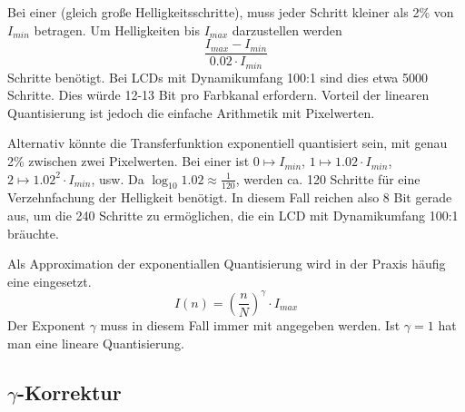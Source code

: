 Bei einer  (gleich große Helligkeitsschritte), muss jeder Schritt kleiner als 2\% von $I_{min}$ betragen.
Um Helligkeiten bis $I_{max}$ darzustellen werden
\[
	\frac{I_{max} - I_{min}}{0.02 \cdot I_{min}}
\]
Schritte benötigt.
Bei LCDs mit Dynamikumfang 100:1 sind dies etwa 5000 Schritte.
Dies würde 12-13 Bit pro Farbkanal erfordern.
Vorteil der linearen Quantisierung ist jedoch die einfache Arithmetik mit Pixelwerten.

Alternativ könnte die Transferfunktion exponentiell quantisiert sein, mit genau 2\% zwischen zwei Pixelwerten.
Bei einer  ist $0 \mapsto I_{min}$, $1 \mapsto 1.02 \cdot I_{min}$, $2 \mapsto 1.02^2 \cdot I_{min}$, usw.
Da $\log_{10} 1.02 \approx \frac{1}{120}$, werden ca. 120 Schritte für eine Verzehnfachung der Helligkeit benötigt.
In diesem Fall reichen also 8 Bit gerade aus, um die 240 Schritte zu ermöglichen, die ein LCD mit Dynamikumfang 100:1 bräuchte.

Als Approximation der exponentiallen Quantisierung wird in der Praxis häufig eine  eingesetzt.
\[
	I(n) = \left(\frac{n}{N}\right)^\gamma \cdot I_{max}
\]
Der Exponent $\gamma$ muss in diesem Fall immer mit angegeben werden.
Ist $\gamma = 1$ hat man eine lineare Quantisierung.

\subsection{$\gamma$-Korrektur}
